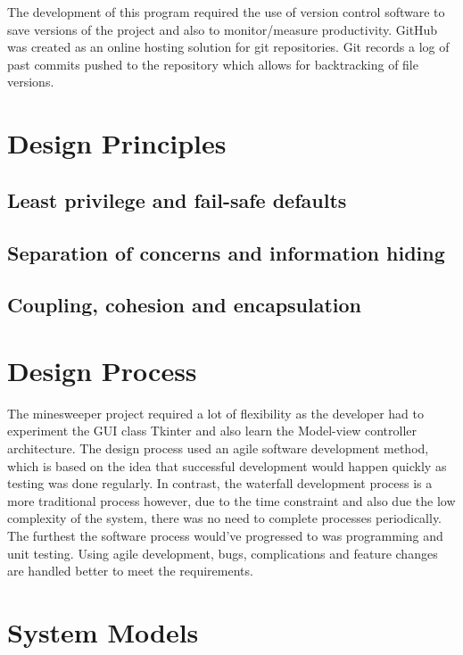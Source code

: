 \documentclass[12pt, a4]{report}
\begin{document}
	The development of this program required the use of version control software to save versions of the project and also to monitor/measure productivity. GitHub was created as an online hosting solution for git repositories. Git records a log of past commits pushed to the repository which allows for backtracking of file versions.
	\section{Design Principles}
	\subsection{Least privilege and fail-safe defaults}
	\par
	
	\subsection{Separation of concerns and information hiding}
	\par
	
	\subsection{Coupling, cohesion and encapsulation}
	\par
	
	\section{Design Process}
	\par
	The minesweeper project required a lot of flexibility as the developer had to experiment the GUI class Tkinter and also learn the Model-view controller architecture. The design process used an agile software development method, which is based on the idea that successful development would happen quickly as testing was done regularly. In contrast, the waterfall development process is a more traditional process however, due to the time constraint and also due the low complexity of the system, there was no need to complete processes periodically. The furthest the software process would've progressed to was programming and unit testing. Using agile development, bugs, complications and feature changes are handled better to meet the requirements.
	
	\section{System Models}
\end{document}
